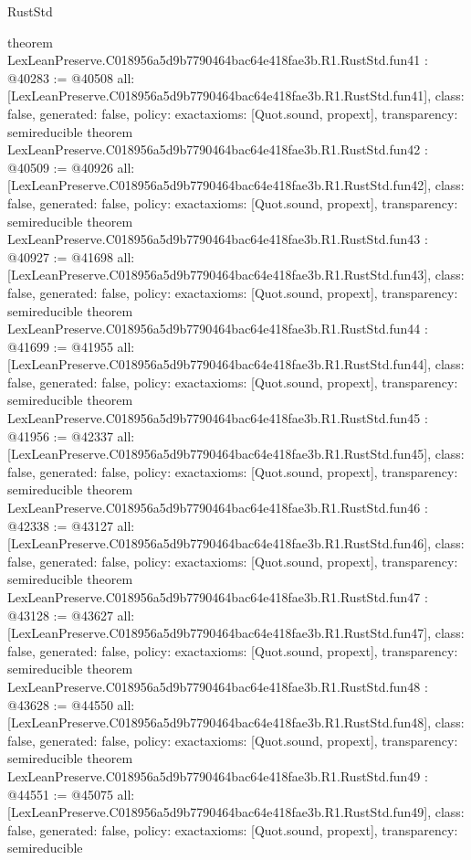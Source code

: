 \begin{lexlean}{RustStd}
\begin{coremodule}
{}
theorem LexLeanPreserve.C018956a5d9b7790464bac64e418fae3b.R1.RustStd.fun41 : @40283 := @40508 {
  all: [LexLeanPreserve.C018956a5d9b7790464bac64e418fae3b.R1.RustStd.fun41],
  class: false,
  generated: false,
  policy: exact{axioms: [Quot.sound, propext]},
  transparency: semireducible
}
theorem LexLeanPreserve.C018956a5d9b7790464bac64e418fae3b.R1.RustStd.fun42 : @40509 := @40926 {
  all: [LexLeanPreserve.C018956a5d9b7790464bac64e418fae3b.R1.RustStd.fun42],
  class: false,
  generated: false,
  policy: exact{axioms: [Quot.sound, propext]},
  transparency: semireducible
}
theorem LexLeanPreserve.C018956a5d9b7790464bac64e418fae3b.R1.RustStd.fun43 : @40927 := @41698 {
  all: [LexLeanPreserve.C018956a5d9b7790464bac64e418fae3b.R1.RustStd.fun43],
  class: false,
  generated: false,
  policy: exact{axioms: [Quot.sound, propext]},
  transparency: semireducible
}
theorem LexLeanPreserve.C018956a5d9b7790464bac64e418fae3b.R1.RustStd.fun44 : @41699 := @41955 {
  all: [LexLeanPreserve.C018956a5d9b7790464bac64e418fae3b.R1.RustStd.fun44],
  class: false,
  generated: false,
  policy: exact{axioms: [Quot.sound, propext]},
  transparency: semireducible
}
theorem LexLeanPreserve.C018956a5d9b7790464bac64e418fae3b.R1.RustStd.fun45 : @41956 := @42337 {
  all: [LexLeanPreserve.C018956a5d9b7790464bac64e418fae3b.R1.RustStd.fun45],
  class: false,
  generated: false,
  policy: exact{axioms: [Quot.sound, propext]},
  transparency: semireducible
}
theorem LexLeanPreserve.C018956a5d9b7790464bac64e418fae3b.R1.RustStd.fun46 : @42338 := @43127 {
  all: [LexLeanPreserve.C018956a5d9b7790464bac64e418fae3b.R1.RustStd.fun46],
  class: false,
  generated: false,
  policy: exact{axioms: [Quot.sound, propext]},
  transparency: semireducible
}
theorem LexLeanPreserve.C018956a5d9b7790464bac64e418fae3b.R1.RustStd.fun47 : @43128 := @43627 {
  all: [LexLeanPreserve.C018956a5d9b7790464bac64e418fae3b.R1.RustStd.fun47],
  class: false,
  generated: false,
  policy: exact{axioms: [Quot.sound, propext]},
  transparency: semireducible
}
theorem LexLeanPreserve.C018956a5d9b7790464bac64e418fae3b.R1.RustStd.fun48 : @43628 := @44550 {
  all: [LexLeanPreserve.C018956a5d9b7790464bac64e418fae3b.R1.RustStd.fun48],
  class: false,
  generated: false,
  policy: exact{axioms: [Quot.sound, propext]},
  transparency: semireducible
}
theorem LexLeanPreserve.C018956a5d9b7790464bac64e418fae3b.R1.RustStd.fun49 : @44551 := @45075 {
  all: [LexLeanPreserve.C018956a5d9b7790464bac64e418fae3b.R1.RustStd.fun49],
  class: false,
  generated: false,
  policy: exact{axioms: [Quot.sound, propext]},
  transparency: semireducible
}
\end{coremodule}
\end{lexlean}
